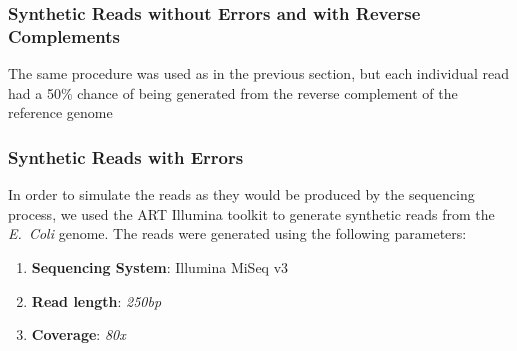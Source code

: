 \subsubsection{Synthetic Reads without Errors and with Reverse Complements}

The same procedure was used as in the previous section, but each individual read had a 50\% chance of being generated from the reverse complement of the reference genome 

\subsubsection{Synthetic Reads with Errors}

In order to simulate the reads as they would be produced by the sequencing process, we used the ART Illumina toolkit to generate
synthetic reads from the \emph{E.~Coli} genome. The reads were generated using the following parameters:

\begin{enumerate}
\item \textbf{Sequencing System}: Illumina MiSeq v3
\item \textbf{Read length}: \textit{250bp}
\item \textbf{Coverage}: \textit{80x}
\end{enumerate}